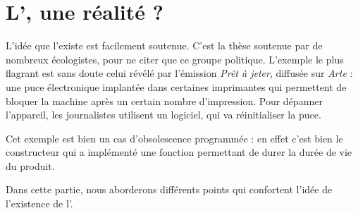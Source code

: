 \section{L'\op, une réalité ?}

L'idée que l'\op existe est facilement soutenue. C'est la thèse soutenue par de nombreux écologistes, pour ne citer que ce groupe politique. 
\smallbreak
L'exemple le plus flagrant est sans doute celui révélé par l'émission  \textit{Prêt à jeter}, diffusée sur \textit{Arte} : une puce électronique implantée dans certaines imprimantes qui permettent de bloquer la machine après un certain nombre d'impression. Pour dépanner l'appareil, les journalistes utilisent un logiciel, qui va réinitialiser la puce. 

Cet exemple est bien un cas d'obsolescence programmée : en effet c'est bien le constructeur qui a implémenté une fonction permettant de durer la durée de vie du produit. 

\smallbreak

Dans cette partie, nous aborderons différents points qui confortent l'idée de l’existence de l'\op.
